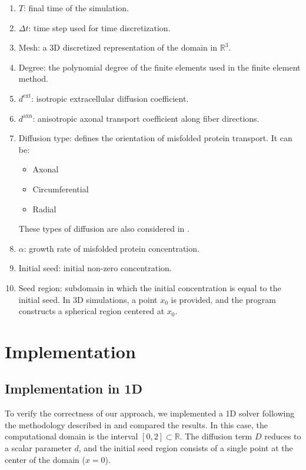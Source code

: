 \documentclass[12pt, a4paper, twoside, openright]{report}
\begin{document}
\begin{enumerate}
  \item \(T\): final time of the simulation.
  \item \(\Delta t\): time step used for time discretization.
  \item Mesh: a 3D discretized representation of the domain in \(\mathbb{R}^3\).
  \item Degree: the polynomial degree of the finite elements used in the finite element method.
  \item \(d^{\mathrm{ext}}\): isotropic extracellular diffusion coefficient.
  \item \(d^{\mathrm{axn}}\): anisotropic axonal transport coefficient along fiber directions.
  \item Diffusion type: defines the orientation of misfolded protein transport. It can be:
        \begin{itemize}
          \item Axonal
          \item Circumferential
          \item Radial
        \end{itemize}
        These types of diffusion are also considered in \cite{WEICKENMEIER2019264}.
  \item \(\alpha\): growth rate of misfolded protein concentration.
  \item Initial seed: initial non-zero concentration.
  \item Seed region: subdomain in which the initial concentration is equal to the initial seed. In 3D simulations, a point \(x_0\) is provided, and the program constructs a spherical region centered at \(x_0\).
\end{enumerate}

\section{Implementation}
\subsection{Implementation in 1D}
To verify the correctness of our approach, we implemented a 1D solver following the methodology described in \cite{WEICKENMEIER2019264} and compared the results. In this case, the computational domain is the interval \([0,2] \subset \mathbb{R}\). The diffusion term \(D\) reduces to a scalar parameter \(d\), and the initial seed region consists of a single point at the center of the domain (\(x = 0\)).
\end{document}
